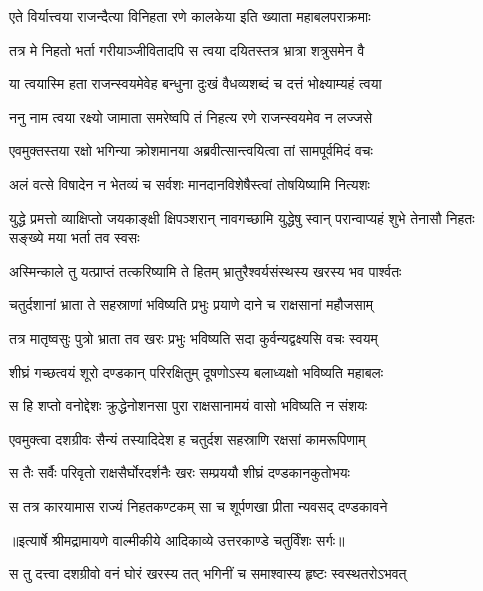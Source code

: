 \twolineshloka
{एते विर्यात्त्वया राजन्दैत्या विनिहता रणे}
{कालकेया इति ख्याता महाबलपराक्रमाः} %

\twolineshloka
{तत्र मे निहतो भर्ता गरीयाञ्जीवितादपि}
{स त्वया दयितस्तत्र भ्रात्रा शत्रुसमेन वै} %

\twolineshloka
{या त्वयास्मि हता राजन्स्वयमेवेह बन्धुना}
{दुःखं वैधव्यशब्दं च दत्तं भोक्ष्याम्यहं त्वया} %

\twolineshloka
{ननु नाम त्वया रक्ष्यो जामाता समरेष्वपि}
{तं निहत्य रणे राजन्स्वयमेव न लज्जसे} %

\twolineshloka
{एवमुक्तस्तया रक्षो भगिन्या क्रोशमानया}
{अब्रवीत्सान्त्वयित्वा तां सामपूर्वमिदं वचः} %

\twolineshloka
{अलं वत्से विषादेन न भेतव्यं च सर्वशः}
{मानदानविशेषैस्त्वां तोषयिष्यामि नित्यशः} %

\threelineshloka
{युद्धे प्रमत्तो व्याक्षिप्तो जयकाङ्क्षी क्षिपञ्शरान्}
{नावगच्छामि युद्धेषु स्वान् परान्वाप्यहं शुभे}
{तेनासौ निहतः सङ्ख्ये मया भर्ता तव स्वसः} %

\twolineshloka
{अस्मिन्काले तु यत्प्राप्तं तत्करिष्यामि ते हितम्}
{भ्रातुरैश्वर्यसंस्थस्य खरस्य भव पार्श्वतः} %

\twolineshloka
{चतुर्दशानां भ्राता ते सहस्राणां भविष्यति}
{प्रभुः प्रयाणे दाने च राक्षसानां महौजसाम्} %

\twolineshloka
{तत्र मातृष्वसुः पुत्रो भ्राता तव खरः प्रभुः}
{भविष्यति सदा कुर्वन्यद्वक्ष्यसि वचः स्वयम्} %

\twolineshloka
{शीघ्रं गच्छत्वयं शूरो दण्डकान् परिरक्षितुम्}
{दूषणोऽस्य बलाध्यक्षो भविष्यति महाबलः} %

\twolineshloka
{स हि शप्तो वनोद्देशः क्रुद्धेनोशनसा पुरा}
{राक्षसानामयं वासो भविष्यति न संशयः} %

\twolineshloka
{एवमुक्त्वा दशग्रीवः सैन्यं तस्यादिदेश ह}
{चतुर्दश सहस्राणि रक्षसां कामरूपिणाम्} %

\twolineshloka
{स तैः सर्वैः परिवृतो राक्षसैर्घोरदर्शनैः}
{खरः सम्प्रययौ शीघ्रं दण्डकानकुतोभयः} %

\twolineshloka
{स तत्र कारयामास राज्यं निहतकण्टकम्}
{सा च शूर्पणखा प्रीता न्यवसद् दण्डकावने} %


{॥इत्यार्षे श्रीमद्रामायणे वाल्मीकीये आदिकाव्ये उत्तरकाण्डे चतुर्विंशः सर्गः॥}


\twolineshloka
{स तु दत्त्वा दशग्रीवो वनं घोरं खरस्य तत्}
{भगिनीं च समाश्वास्य हृष्टः स्वस्थतरोऽभवत्} %

